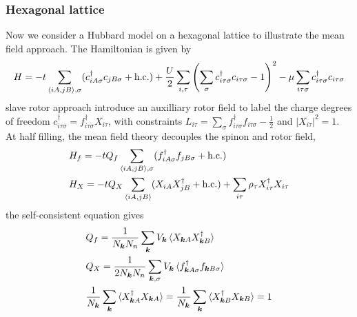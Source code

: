\documentclass{article}
\begin{document}
\subsubsection{Hexagonal lattice}
Now we consider a Hubbard model on a hexagonal lattice to illustrate the mean field approach. The Hamiltonian is given by
\begin{align*}
    H = -t\sum_{\braket{iA,jB},\sigma}(c_{iA\sigma}^{\dagger}c_{jB\sigma}+\text{h.c.})+\frac{U}{2}\sum_{i,\tau}\left(\sum_{\sigma}c_{i\tau\sigma}^{\dagger}c_{i\tau\sigma}-1\right)^2-\mu\sum_{i\tau\sigma}c_{i\tau\sigma}^{\dagger}c_{i\tau\sigma}
\end{align*}
slave rotor approach introduce an auxilliary rotor field to label the charge degrees of freedom $c_{i\tau\sigma}^{\dagger} = f_{i\tau\sigma}^{\dagger}X_{i\tau}$, with constraints $L_{i\tau} = \sum_{\sigma}f_{i\tau\sigma}^{\dagger}f_{i\tau\sigma} -\frac{1}{2}$ and $|X_{i\tau}|^2 = 1$. At half filling, the mean field theory decouples the spinon and rotor field,
\begin{align*}
    &H_f = -tQ_f\sum_{\braket{iA,jB},\sigma}(f_{iA\sigma}^{\dagger}f_{jB\sigma}+\text{h.c.}) \\
    &H_X = -tQ_X\sum_{\braket{iA,jB}}(X_{iA}X_{jB}^{\dagger}+\text{h.c.})+\sum_{i\tau}\rho_{\tau}X_{i\tau}^{\dagger}X_{i\tau}
\end{align*}
the self-consistent equation gives
\begin{align*}
      &Q_f = \frac{1}{N_{\bm{k}}N_n}\sum_{\bm{k}}V_{\bm{k}}\braket{X_{\bm{k}A}X_{\bm{k}B}^{\dagger}}\\
      &Q_X = \frac{1}{2N_{\bm{k}}N_n}\sum_{\bm{k},\sigma}V_{\bm{k}}\braket{f_{\bm{k}A\sigma}^{\dagger}f_{\bm{k}B\sigma}}\\
      & \frac{1}{N_{\bm{k}}}\sum_{\bm{k}}\braket{X_{\bm{k}A}^{\dagger}X_{\bm{k}A}} = \frac{1}{N_{\bm{k}}}\sum_{\bm{k}}\braket{X_{\bm{k}B}^{\dagger}X_{\bm{k}B}} = 1 
\end{align*}
\end{document}
